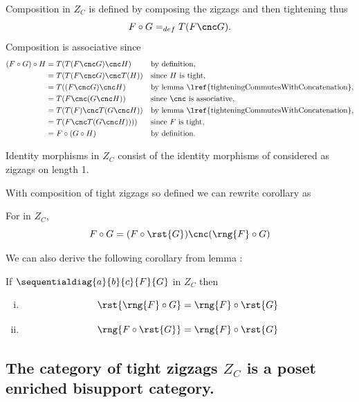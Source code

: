 Composition in $Z_C$ is defined by composing the zigzags and then tightening  thus
\[
F \circ G =_{def} T(F \cnc G).
\]
Composition is associative since 
\begin{align*}
(F \circ G) \circ H 
                &= T(T(F \cnc G) \cnc H) &&   \mbox{by definition,} \\
                &= T(T(F \cnc G) \cnc T(H))
                        &&\mbox{since $H$ is tight,}\\
                &= T((F \cnc G) \cnc H)  
                        &&\mbox{by lemma \lref{tighteningCommutesWithConcatenation},}\\
                &= T(F \cnc (G \cnc H))
                        &&\mbox {since $\cnc$ is associative,} \\
                &= T(T(F) \cnc T(G \cnc H))       
                        &&\mbox{by lemma \lref{tighteningCommutesWithConcatenation},}\\
                &= T(F \cnc T(G \cnc H))))
                        &&\mbox{since $F$ is tight,} \\
                &= F \circ (G \circ H) &&   \mbox{by definition.}                 
\end{align*}

Identity morphisms in $Z_C$ consist of the identity morphisms of \catcw considered 
as zigzags on length 1.

With composition of tight zigzags so defined we can rewrite corollary
 as
\begin{corollary}
For \FGsourcediag in $Z_C$,
\[
F \circ G = (F \circ \rst{G}) \cnc (\rng{F} \circ G) 
\]
\end{corollary}

We can also derive the following corollary from lemma :

\begin{corollary}
If $\sequentialdiag{a}{b}{c}{F}{G}$ in $Z_C$
then 
\begin{enumerate}[(i)]
\item
\[
\rst{\rng{F} \circ G} = \rng{F} \circ \rst{G}
\]
\item
\[
\rng{F \circ \rst{G}} = \rng{F} \circ \rst{G}
\]
\end{enumerate}
\end{corollary}


\subsection{The category of tight zigzags $Z_C$ is a poset enriched bisupport category.}

